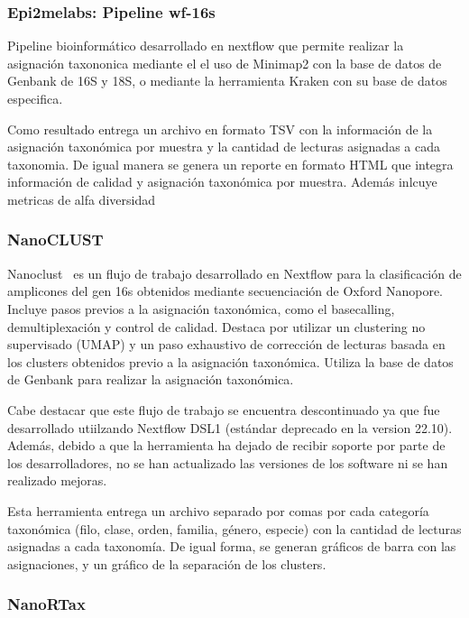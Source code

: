 \subsubsection{Epi2melabs: Pipeline wf-16s}
Pipeline bioinformático desarrollado en nextflow que permite realizar la asignación taxononica mediante el el uso de Minimap2 con la base de datos de Genbank de 16S y 18S, o mediante la herramienta Kraken con su base de datos especifica.

Como resultado entrega un archivo en formato TSV con la información de la asignación taxonómica por muestra y la cantidad de lecturas asignadas a cada taxonomia.
De igual manera se genera un reporte en formato HTML que integra información de calidad y asignación taxonómica por muestra. Además inlcuye metricas de alfa diversidad



\subsubsection{NanoCLUST}
Nanoclust~\cite{10.1093/bioinformatics/btaa900} es un flujo de trabajo desarrollado en Nextflow para la clasificación de amplicones del gen 16s obtenidos mediante secuenciación de Oxford Nanopore. 
Incluye pasos previos a la asignación taxonómica, como el basecalling, demultiplexación y control de calidad. 
Destaca por utilizar un clustering no supervisado (UMAP) y un paso exhaustivo de corrección de lecturas basada en los clusters obtenidos previo a la asignación taxonómica.
Utiliza la base de datos de Genbank para realizar la asignación taxonómica.

Cabe destacar que este flujo de trabajo se encuentra descontinuado ya que fue desarrollado utiilzando Nextflow DSL1 (estándar deprecado en la version 22.10). Además, debido a que la herramienta ha dejado de recibir soporte por parte de los desarrolladores, no se han actualizado las versiones de los software ni se han realizado mejoras.

Esta herramienta entrega un archivo separado por comas por cada categoría taxonómica (filo, clase, orden, familia, género, especie) con la cantidad de lecturas asignadas a cada taxonomía. 
De igual forma, se generan gráficos de barra con las asignaciones, y un gráfico de la separación de los clusters. 
\subsubsection{NanoRTax}

